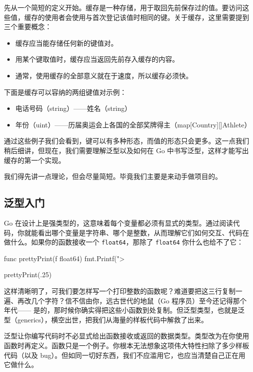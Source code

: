 先从一个简短的定义开始。缓存是一种存储，用于取回先前保存过的值。要访问这些值，缓存的使用者会使用与首次登记该值时相同的键。关于缓存，这里需要提到三个重要概念：

\begin{itemize}
  \item 缓存应当能存储任何新的键值对。
  \item 用某个键取值时，缓存应当返回先前存入缓存的内容。
  \item 通常，使用缓存的全部意义就在于速度，所以缓存必须快。
\end{itemize}

下面是缓存可以容纳的两组键值对示例：

\begin{itemize}
  \item 电话号码（string）——姓名（string）
  \item 年份（uint）——历届奥运会上各国的全部奖牌得主（map[Country][]Athlete）
\end{itemize}

通过这些例子我们会看到，键可以有多种形态，而值的形态只会更多。这一点我们稍后细讲，但现在，我们需要理解泛型以及如何在 Go 中书写泛型，这样才能写出缓存的第一个实现。

我们得先讲一点理论，但会尽量简短。毕竟我们主要是来动手做项目的。

\subsection{泛型入门}

Go 在设计上是强类型的，这意味着每个变量都必须有显式的类型。通过阅读代码，你就能看出哪个变量是字符串、哪个是整数，从而理解它们如何交互、代码在做什么。如果你的函数接收一个 \texttt{float64}，那除了 \texttt{float64} 你什么也给不了它：

\begin{gocode}[]
func prettyPrint(f float64){
    fmt.Printf("> %
}

prettyPrint(.25)
\end{gocode}

这样清晰明了，可我们要怎样写一个打印整数的函数呢？难道要把这三行复制一遍、再改几个字符？信不信由你，远古世代的地鼠（Go 程序员）至今还记得那个年代——
是的，那时候你确实得把这些小函数到处复制。但泛型类型，也就是泛型（generics），横空出世，把我们从海量的样板代码中解救了出来。

泛型让你编写代码时不必显式给出函数接收或返回的数据类型。类型改为在你使用函数时再定义。函数只是一个例子。你根本无法想象这项伟大特性扫除了多少样板代码（以及 bug）。但如同一切好东西，我们不应滥用它，也应当清楚自己正在用它做什么。

